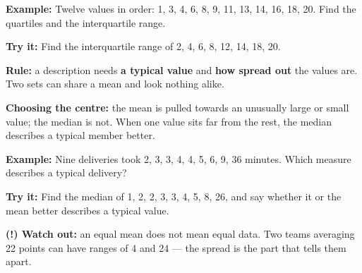 \documentclass[12pt]{article}
\begin{document}
\begin{examplebox}
\textbf{Example:} \quad Twelve values in order: 1, 3, 4, 6, 8, 9, 11, 13, 14,
16, 18, 20. Find the quartiles and the interquartile range.
\end{examplebox}

\begin{tryitbox}
\textbf{Try it:} \quad Find the interquartile range of 2, 4, 6, 8, 12, 14, 18,
20.\\[2pt]
\end{tryitbox}


\begin{formulabox}
\textbf{Rule:} a description needs \textbf{a typical value} and \textbf{how
spread out} the values are. Two sets can share a mean and look nothing alike.\par
\textbf{Choosing the centre:} the mean is pulled towards an unusually large or
small value; the median is not. When one value sits far from the rest, the
median describes a typical member better.
\end{formulabox}

\begin{examplebox}
\textbf{Example:} \quad Nine deliveries took 2, 3, 3, 4, 4, 5, 6, 9, 36 minutes.
Which measure describes a typical delivery?
\end{examplebox}

\begin{tryitbox}
\textbf{Try it:} \quad Find the median of 1, 2, 2, 3, 3, 4, 5, 8, 26, and say
whether it or the mean better describes a typical value.\\[2pt]
\end{tryitbox}

\begin{watchoutbox}
\textbf{(!) Watch out:} an equal mean does not mean equal data. Two teams
averaging 22 points can have ranges of 4 and 24 --- the spread is the part that
tells them apart.
\end{watchoutbox}
\end{document}
